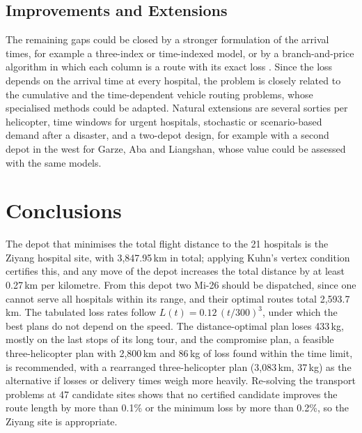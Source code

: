 \documentclass[11pt,a4paper]{article}
\theoremstyle{definition}
\begin{document}
\subsection{Improvements and Extensions}
The remaining gaps could be closed by a stronger formulation of the arrival times, for example a three-index or time-indexed model, or by a branch-and-price algorithm in which each column is a route with its exact loss \citep{toth2014}.
Since the loss depends on the arrival time at every hospital, the problem is closely related to the cumulative and the time-dependent vehicle routing problems, whose specialised methods could be adapted.
Natural extensions are several sorties per helicopter, time windows for urgent hospitals, stochastic or scenario-based demand after a disaster, and a two-depot design, for example with a second depot in the west for Garze, Aba and Liangshan, whose value could be assessed with the same models.

\section{Conclusions}\label{sec:conclusions}
The depot that minimises the total flight distance to the 21 hospitals is the Ziyang hospital site, with 3{,}847.95\,km in total; applying Kuhn's vertex condition certifies this, and any move of the depot increases the total distance by at least 0.27\,km per kilometre.
From this depot two Mi-26 should be dispatched, since one cannot serve all hospitals within its range, and their optimal routes total 2{,}593.7\,km.
The tabulated loss rates follow $L(t)=0.12\,(t/300)^3$, under which the best plans do not depend on the speed.
The distance-optimal plan loses 433\,kg, mostly on the last stops of its long tour, and the compromise plan, a feasible three-helicopter plan with 2{,}800\,km and 86\,kg of loss found within the time limit, is recommended, with a rearranged three-helicopter plan (3{,}083\,km, 37\,kg) as the alternative if losses or delivery times weigh more heavily.
Re-solving the transport problems at 47 candidate sites shows that no certified candidate improves the route length by more than 0.1\% or the minimum loss by more than 0.2\%, so the Ziyang site is appropriate.
\end{document}
